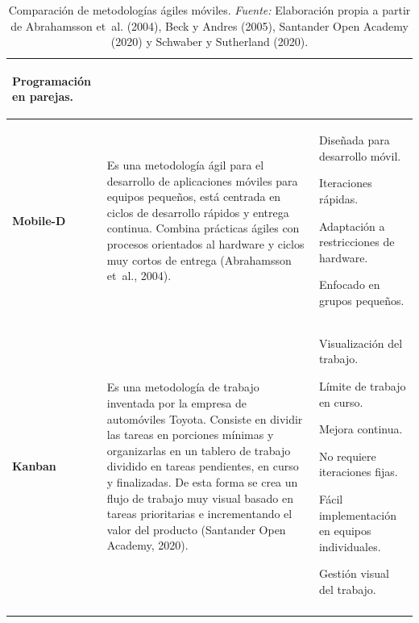 {\begin{longtable}{|L{2.4cm}|L{7.05cm}|L{5.2cm}|}
\begin{tablista}
  \item Programación en parejas.
\end{tablista} \\
\hline
\textbf{Mobile-D} & Es una metodología ágil para el desarrollo de aplicaciones
móviles para equipos pequeños, está centrada en ciclos de desarrollo rápidos y
entrega continua. Combina prácticas ágiles con procesos orientados al hardware
y ciclos muy cortos de entrega (Abrahamsson et~al., 2004). &
\begin{tablista}
  \item Diseñada para desarrollo móvil.
  \item Iteraciones rápidas.
  \item Adaptación a restricciones de hardware.
  \item Enfocado en grupos pequeños.
\end{tablista} \\
\hline
\textbf{Kanban} & Es una metodología de trabajo inventada por la empresa de
automóviles Toyota. Consiste en dividir las tareas en porciones mínimas y
organizarlas en un tablero de trabajo dividido en tareas pendientes, en curso y
finalizadas. De esta forma se crea un flujo de trabajo muy visual basado en
tareas prioritarias e incrementando el valor del producto (Santander Open Academy, 2020). &
\begin{tablista}
  \item Visualización del trabajo.
  \item Límite de trabajo en curso.
  \item Mejora continua.
  \item No requiere iteraciones fijas.
  \item Fácil implementación en equipos individuales.
  \item Gestión visual del trabajo.
\end{tablista} \\ \hline
\caption[Comparación de metodologías ágiles móviles]{Comparación de metodologías ágiles móviles. \textit{Fuente:} Elaboración propia a partir de Abrahamsson et~al. (2004), Beck y Andres (2005), Santander Open Academy (2020) y Schwaber y Sutherland (2020).}\label{tab:metodologias-agiles}\\
\end{longtable}
}



